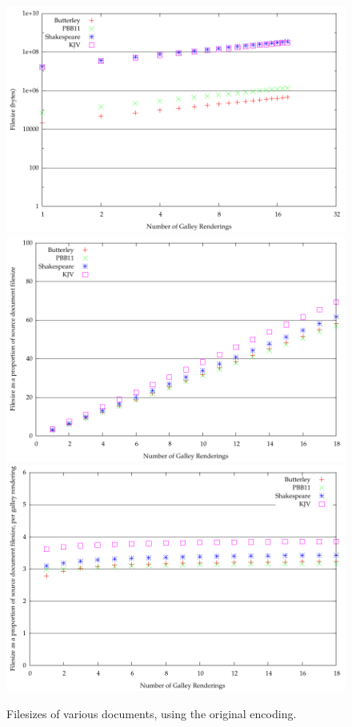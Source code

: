 \begin{figure}
  \begin{center}
  \includegraphics[width=\textwidth]{gnuplot/2-b}
  \includegraphics[width=\textwidth]{gnuplot/2-s}
  \includegraphics[width=\textwidth]{gnuplot/2-r}
  \end{center}
  \caption[Filesizes of documents in original encoding]{Filesizes of various documents, using the original encoding.}
  \label{fig:size-json}
\end{figure}



